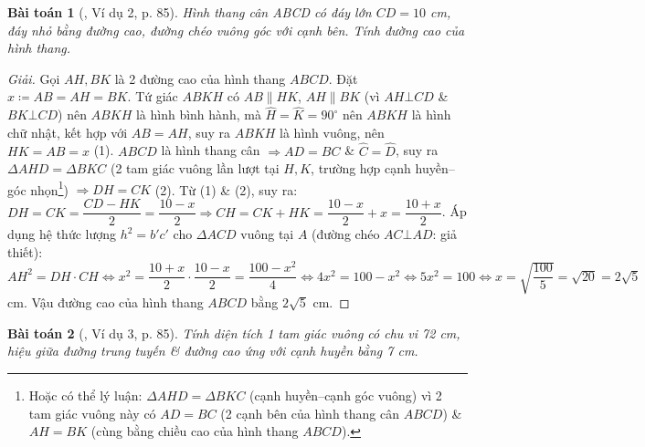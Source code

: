 \documentclass{article}
\newtheorem{baitoan}{Bài toán}
\begin{document}
\begin{baitoan}[\cite{Binh_Toan_9_tap_1}, Ví dụ 2, p. 85]
	Hình thang cân ABCD có đáy lớn $CD = 10$ {\rm cm}, đáy nhỏ bằng đường cao, đường chéo vuông góc với cạnh bên. Tính đường cao của hình thang.
\end{baitoan}

\begin{proof}[Giải]
	Gọi $AH,BK$ là 2 đường cao của hình thang $ABCD$. Đặt $x\coloneqq AB = AH = BK$. Tứ giác $ABKH$ có $AB\parallel HK$, $AH\parallel BK$ (vì $AH\bot CD$ \& $BK\bot CD$) nên $ABKH$ là hình bình hành, mà $\widehat{H} = \widehat{K} = 90^\circ$ nên $ABKH$ là hình chữ nhật, kết hợp với $AB = AH$, suy ra $ABKH$ là hình vuông, nên $HK = AB = x$ (1). $ABCD$ là hình thang cân $\Rightarrow AD = BC$ \& $\widehat{C} = \widehat{D}$, suy ra $\Delta AHD = \Delta BKC$ (2 tam giác vuông lần lượt tại $H,K$, trường hợp cạnh huyền--góc nhọn\footnote{Hoặc có thể lý luận: $\Delta AHD = \Delta BKC$ (cạnh huyền--cạnh góc vuông) vì 2 tam giác vuông này có $AD = BC$ (2 cạnh bên của hình thang cân $ABCD$) \& $AH = BK$ (cùng bằng chiều cao của hình thang $ABCD$).}) $\Rightarrow DH = CK$ (2). Từ (1) \& (2), suy ra: $DH = CK = \dfrac{CD - HK}{2} = \dfrac{10 - x}{2}\Rightarrow CH = CK + HK = \dfrac{10 - x}{2} + x = \dfrac{10 + x}{2}$. Áp dụng hệ thức lượng $h^2 = b'c'$ cho $\Delta ACD$ vuông tại $A$ (đường chéo $AC\bot AD$: giả thiết): $AH^2 = DH\cdot CH\Leftrightarrow x^2 = \dfrac{10 + x}{2}\cdot\dfrac{10 - x}{2} = \dfrac{100 - x^2}{4}\Leftrightarrow4x^2 = 100 - x^2\Leftrightarrow5x^2 = 100\Leftrightarrow x = \sqrt{\dfrac{100}{5}} = \sqrt{20} = 2\sqrt{5}$ cm. Vậu đường cao của hình thang $ABCD$ bằng $2\sqrt{5}$ cm.
\end{proof}

\begin{baitoan}[\cite{Binh_Toan_9_tap_1}, Ví dụ 3, p. 85]
	Tính diện tích 1 tam giác vuông có chu vi {\rm72 cm}, hiệu giữa đường trung tuyến \& đường cao ứng với cạnh huyền bằng {\rm7 cm}.
\end{baitoan}
\end{document}
